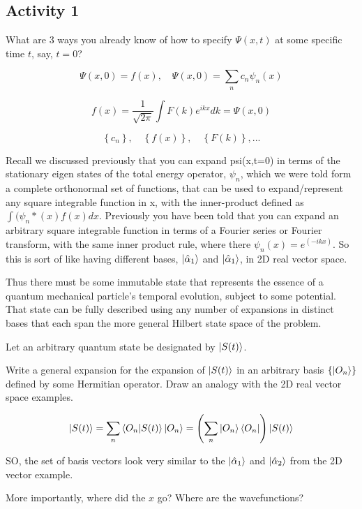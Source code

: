 \documentclass{article}
\begin{document}
\subsection{Activity 1}

What are 3 ways you already know of how to specify $\Psi(x,t)$ at some specific time $t$, say, $t = 0$?

$$\Psi(x,0) = f(x), \quad \Psi(x,0) = \sum_n c_n \psi_n(x)$$

$$f(x) = \frac{1}{\sqrt{2 \pi}} \int F(k) e^{ikx} dk = \Psi(x,0)$$

$$\left\{ c_n \right\}, \quad \left\{ f(x) \right\}, \quad \left\{ F(k) \right\}, ...$$


Recall we discussed previously that you can expand psi(x,t=0) in terms of the stationary eigen states of the total energy operator, $\psi_n$, which we were told form a complete orthonormal set of functions, that can be used to expand/represent any square integrable function in x, with the inner-product defined as $\int (\psi_n*(x) f(x) dx$.   Previously you have been told that you can expand an arbitrary square integrable function in terms of a Fourier series or Fourier transform, with the same inner product rule, where there $\psi_n(x)=e^(-ikx)$.  So this is sort of like having different bases, $\ket{\hat{\alpha}_1}$  and $\ket{\hat{\alpha}_1}$, in 2D real vector space. 

\hfill

Thus there must be some immutable state that represents the essence of a quantum mechanical particle’s temporal evolution, subject to some potential.  That state can be fully described using any number of expansions in distinct bases that each span the more general Hilbert state space of the problem. 

Let an arbitrary quantum state be designated by $\ket{S(t)}$. 

Write a general expansion for the expansion of $\ket{S(t)}$ in an arbitrary basis $\left\{ \ket{O_n} \right\}$ defined by some Hermitian operator. Draw an analogy with the 2D real vector space examples. 

$$\ket{S(t)} = \sum_n \braket{O_n | S(t)} \ket{O_n} = \left( \sum_n \ket{O_n} \bra{O_n} \right) \ket{S(t)}$$

SO, the set of basis vectors look very similar to the $\ket{\hat{\alpha}_1}$ and $\ket{\hat{\alpha}_2}$ from the 2D vector example. 

More importantly, where did the $x$ go? Where are the wavefunctions?
\end{document}
